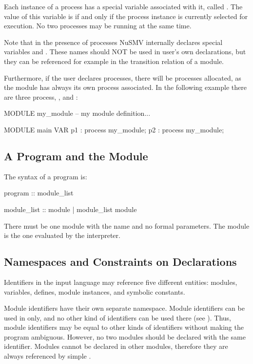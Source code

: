 Each instance of a process has a special \Boolean variable associated
with it, called .
%
The value of this variable is  if and only if the process
instance is currently selected for execution.
%
No two processes may be running at the same time.

Note that in the presence of processes NuSMV internally declares
special variables  and .
These names should NOT be used in user's own declarations, but they
can be referenced for example in the transition relation of a module.

Furthermore, if the user declares  processes, there will be
 processes allocated, as the module  has always its 
own process associated. In the following example there are three
process, ,  and :
%
\begin{nusmvCode}
MODULE my_module
  -- my module definition...

MODULE main
  VAR 
    p1 : process my_module;
    p2 : process my_module;

\end{nusmvCode}
%

\subsection{A Program and the  Module}
\label{Main Module}
%
The syntax of a \nusmv program is:
%
\begin{Grammar}
program :: module_list

module_list ::
          module
        | module_list module
\end{Grammar}
%
There must be one module with the name  and no formal
parameters.
%
The module  is the one evaluated by the interpreter.

\subsection{Namespaces and Constraints on Declarations}
\label{Namespaces}
%
Identifiers in the \nusmv input language may reference five different
entities: modules, variables, defines, module instances, and symbolic
constants.

Module identifiers have their own separate namespace. 
%
Module identifiers can be used in 
only, and no other kind of identifiers can be used there (see
).
%
Thus, module identifiers may be equal to other kinds of identifiers
without making the program ambiguous. 
%
However, no two modules should be declared with the same
identifier. 
%
Modules cannot be declared in other modules, therefore they are always
referenced by simple .


